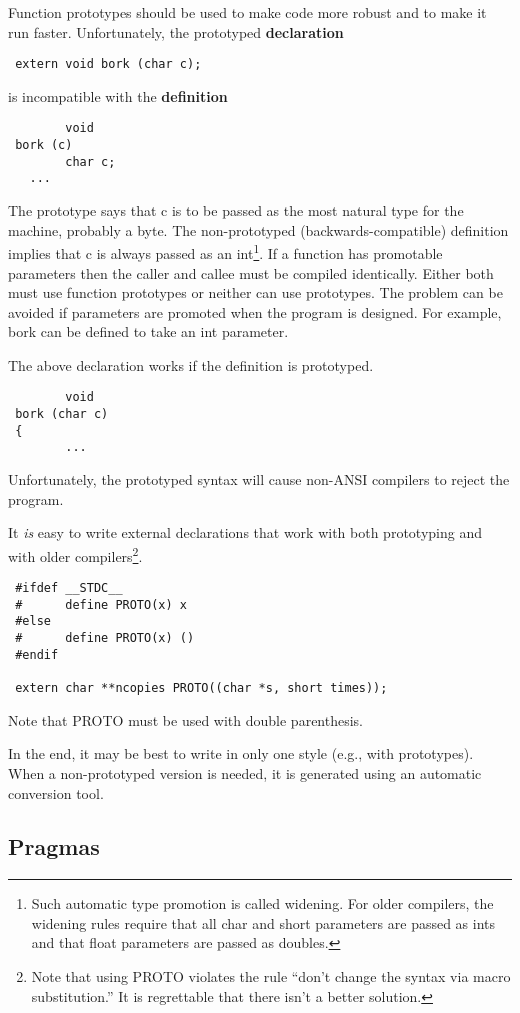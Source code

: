  Function prototypes should be used to make code more robust and to make it run
faster. Unfortunately, the prototyped {\bf declaration}
\begin{verbatim}
 extern void bork (char c); 
\end{verbatim}
is incompatible with the {\bf definition}
\begin{verbatim}
        void
 bork (c)
        char c;
   ... 
\end{verbatim}
The prototype says that c is to be passed as the most natural type for the
machine, probably a byte. The non-prototyped (backwards-compatible) definition
implies that c is always passed as an int\footnote{Such automatic type
promotion is called widening. For older compilers, the
widening rules require that all char and short parameters are passed as ints
and that float parameters are passed as doubles.}.
If a function has promotable
parameters then the caller and callee must be compiled identically. Either
both must use function prototypes or neither can use prototypes. The problem
can be avoided if parameters are promoted when the program is designed. For
example, bork can be defined to take an int parameter. 

 The above declaration works if the definition is prototyped. 
\begin{verbatim}
        void
 bork (char c)
 {
        ... 
\end{verbatim}
Unfortunately, the prototyped syntax will cause non-ANSI compilers to reject
the program. 

It {\em is} easy to write external declarations that work with both
prototyping and with older compilers\footnote{Note that using PROTO
violates the rule ``don't change the syntax via macro substitution.''
It is regrettable that there isn't a better solution.}.
\begin{verbatim}
 #ifdef __STDC__
 #      define PROTO(x) x
 #else
 #      define PROTO(x) ()
 #endif

 extern char **ncopies PROTO((char *s, short times));
\end{verbatim}
Note that PROTO must be used with double parenthesis. 

In the end, it may be best to write in only one style (e.g., with prototypes).
When a non-prototyped version is needed, it is generated using an automatic
conversion tool.

\subsection{Pragmas}

